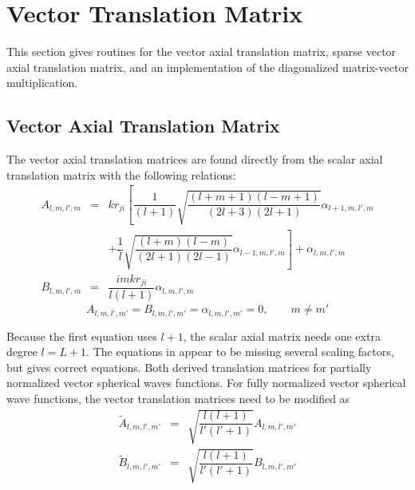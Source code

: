 {\footnotesize
{}
}



\clearpage
\newpage

\section{Vector Translation Matrix}

This section gives routines for the vector axial translation matrix, sparse vector axial translation matrix, and an implementation of the diagonalized matrix-vector multiplication.  
\vspace{-1mm}
\subsection{Vector Axial Translation Matrix}

The vector axial translation matrices are found directly from the scalar axial translation matrix with the following relations:
\begin{eqnarray}
A_{l,m,l',m} &=& k r_{ji}\left[\dfrac{1}{(l+1)}\sqrt{\dfrac{(l+m+1)(l-m+1)}{(2l+3)(2l+1)}} \alpha_{l+1,m,l',m} \right. \nonumber \\
\ & \ & + \left. \dfrac{1}{l}\sqrt{\dfrac{(l+m)(l-m)}{(2l+1)(2l-1)}}\alpha_{l-1,m,l',m} \right] + \alpha_{l,m,l',m} \\
B_{l,m,l',m} &=& \dfrac{imkr_{ji}}{l(l+1)}\alpha_{l,m,l',m} 
\end{eqnarray}
\begin{equation}
A_{l,m,l',m'} = B_{l,m,l',m'} = \alpha_{l,m,l',m'} = 0, \quad \quad m \ne m'
\end{equation}

Because the first equation uses $l+1$, the scalar axial matrix needs one extra degree $l = L+1$.  The equations in \cite{mackowski1991analysis} appear to be missing several scaling factors, but \cite{chew1993efficient} gives correct equations.  Both \cite{mackowski1991analysis, chew1993efficient} derived translation matrices for partially normalized vector spherical waves functions.  For fully normalized vector spherical wave functions, the vector translation matrices need to be modified as 
\begin{eqnarray}
\widetilde{A}_{l,m,l',m'} &=& \sqrt{\dfrac{l(l+1)}{l'(l'+1)}} A_{l,m,l',m'}\\
\widetilde{B}_{l,m,l',m'} &=& \sqrt{\dfrac{l(l+1)}{l'(l'+1)}}B_{l,m,l',m'}
\end{eqnarray}

